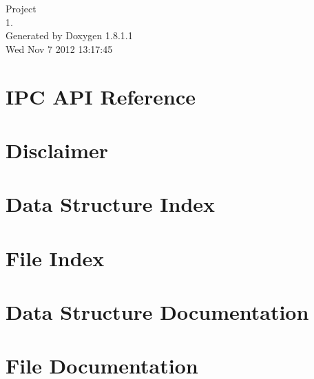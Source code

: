 \documentclass{article}
\begin{document}
\begin{titlepage}
\vspace*{7cm}
\begin{center}
{\Large Project \\[1ex]\large 1. }\\
\vspace*{1cm}
{\large Generated by Doxygen 1.8.1.1}\\
\vspace*{0.5cm}
{\small Wed Nov 7 2012 13:17:45}\\
\end{center}
\end{titlepage}
\tableofcontents
{}
\section{I\-P\-C A\-P\-I Reference}
\label{index}\hypertarget{index}{}
\section{Disclaimer}
\label{Disclaimer}

\section{Data Structure Index}

\section{File Index}

\section{Data Structure Documentation}














\section{File Documentation}













\printindex
\end{document}
